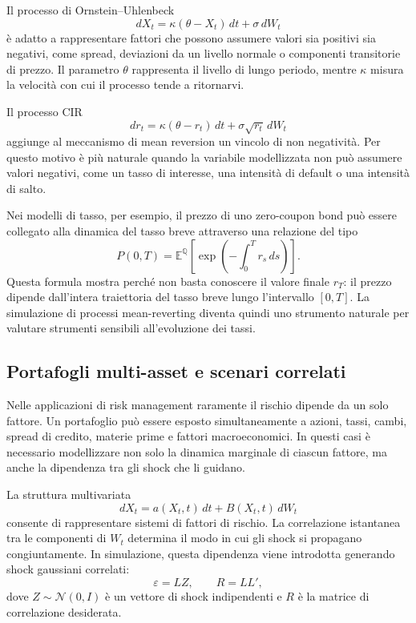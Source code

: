 Il processo di Ornstein--Uhlenbeck
\[
dX_t=\kappa(\theta-X_t)\,dt+\sigma\,dW_t
\]
\`{e} adatto a rappresentare fattori che possono assumere valori sia
positivi sia negativi, come spread, deviazioni da un livello normale o
componenti transitorie di prezzo. Il parametro $\theta$ rappresenta il
livello di lungo periodo, mentre $\kappa$ misura la velocit\`{a} con cui
il processo tende a ritornarvi.

Il processo CIR
\[
dr_t=\kappa(\theta-r_t)\,dt+\sigma\sqrt{r_t}\,dW_t
\]
aggiunge al meccanismo di mean reversion un vincolo di non negativit\`{a}.
Per questo motivo \`{e} pi\`{u} naturale quando la variabile modellizzata
non pu\`{o} assumere valori negativi, come un tasso di interesse, una
intensit\`{a} di default o una intensit\`{a} di salto.

Nei modelli di tasso, per esempio, il prezzo di uno zero-coupon bond pu\`{o}
essere collegato alla dinamica del tasso breve attraverso una relazione
del tipo
\[
P(0,T)
=
\mathbb{E}^{\mathbb{Q}}
\left[
\exp\left(
-\int_0^T r_s\,ds
\right)
\right].
\]
Questa formula mostra perch\'{e} non basta conoscere il valore finale
$r_T$: il prezzo dipende dall'intera traiettoria del tasso breve lungo
l'intervallo $[0,T]$. La simulazione di processi mean-reverting diventa
quindi uno strumento naturale per valutare strumenti sensibili
all'evoluzione dei tassi.

\subsection*{Portafogli multi-asset e scenari correlati}

Nelle applicazioni di risk management raramente il rischio dipende da un
solo fattore. Un portafoglio pu\`{o} essere esposto simultaneamente a
azioni, tassi, cambi, spread di credito, materie prime e fattori
macroeconomici. In questi casi \`{e} necessario modellizzare non solo la
dinamica marginale di ciascun fattore, ma anche la dipendenza tra gli
shock che li guidano.

La struttura multivariata
\[
dX_t=a(X_t,t)\,dt+B(X_t,t)\,dW_t
\]
consente di rappresentare sistemi di fattori di rischio. La correlazione
istantanea tra le componenti di $W_t$ determina il modo in cui gli shock
si propagano congiuntamente. In simulazione, questa dipendenza viene
introdotta generando shock gaussiani correlati:
\[
\varepsilon=LZ,
\qquad
R=LL',
\]
dove $Z\sim\mathcal{N}(0,I)$ \`{e} un vettore di shock indipendenti e
$R$ \`{e} la matrice di correlazione desiderata.


